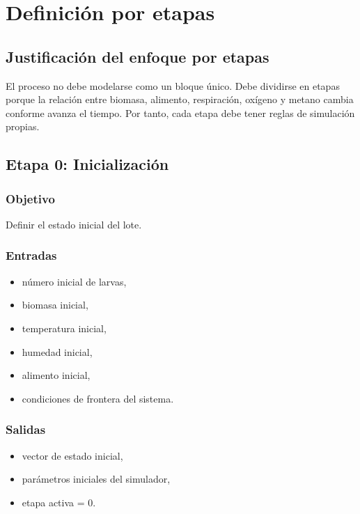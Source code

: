 \documentclass[12pt,a4paper]{report}
\begin{document}
\chapter{Definición por etapas}

\section{Justificación del enfoque por etapas}

El proceso no debe modelarse como un bloque único. Debe dividirse en etapas porque la relación entre biomasa, alimento, respiración, oxígeno y metano cambia conforme avanza el tiempo. Por tanto, cada etapa debe tener reglas de simulación propias.

\section{Etapa 0: Inicialización}

\subsection*{Objetivo}
Definir el estado inicial del lote.

\subsection*{Entradas}
\begin{itemize}[leftmargin=0.7cm]
    \item número inicial de larvas,
    \item biomasa inicial,
    \item temperatura inicial,
    \item humedad inicial,
    \item alimento inicial,
    \item condiciones de frontera del sistema.
\end{itemize}

\subsection*{Salidas}
\begin{itemize}[leftmargin=0.7cm]
    \item vector de estado inicial,
    \item parámetros iniciales del simulador,
    \item etapa activa = 0.
\end{itemize}
\end{document}

